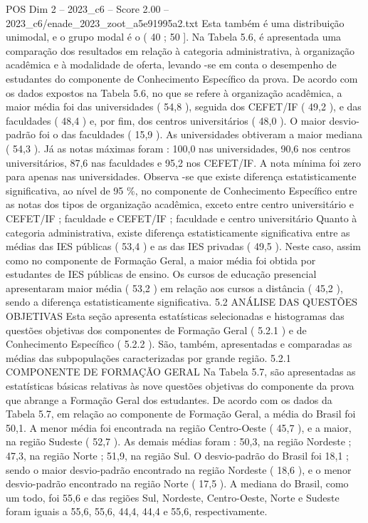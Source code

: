 \begin{textsample}{POS Dim 2 – 2023\_c6 – Score 2.00 – 2023\_c6/enade\_2023\_zoot\_a5e91995a2.txt}
Esta também é uma distribuição unimodal, e o grupo modal é o ( 40 ; 50 ].
Na Tabela 5.6, é apresentada uma comparação dos resultados em relação à categoria administrativa, à organização acadêmica e à modalidade de oferta, levando -se em conta o desempenho de estudantes do componente de Conhecimento Específico da prova.
De acordo com os dados expostos na Tabela 5.6, no que se refere à organização acadêmica, a maior média foi das universidades ( 54,8 ), seguida dos CEFET/IF ( 49,2 ), e das faculdades ( 48,4 ) e, por fim, dos centros universitários ( 48,0 ).
O maior desvio-padrão foi o das faculdades ( 15,9 ).
As universidades obtiveram a maior mediana ( 54,3 ).
Já as notas máximas foram : 100,0 nas universidades, 90,6 nos centros universitários, 87,6 nas faculdades e 95,2 nos CEFET/IF.
A nota mínima foi zero para apenas nas universidades.
Observa -se que existe diferença estatisticamente significativa, ao nível de 95 \%, no componente de Conhecimento Específico entre as notas dos tipos de organização acadêmica, exceto entre centro universitário e CEFET/IF ; faculdade e CEFET/IF ; faculdade e centro universitário Quanto à categoria administrativa, existe diferença estatisticamente significativa entre as médias das IES públicas ( 53,4 ) e as das IES privadas ( 49,5 ).
Neste caso, assim como no componente de Formação Geral, a maior média foi obtida por estudantes de IES públicas de ensino.
Os cursos de educação presencial apresentaram maior média ( 53,2 ) em relação aos cursos a distância ( 45,2 ), sendo a diferença estatisticamente significativa. 5.2 ANÁLISE DAS QUESTÕES OBJETIVAS Esta seção apresenta estatísticas selecionadas e histogramas das questões objetivas dos componentes de Formação Geral ( 5.2.1 ) e de Conhecimento Específico ( 5.2.2 ).
São, também, apresentadas e comparadas as médias das subpopulações caracterizadas por grande região. 5.2.1 COMPONENTE DE FORMAÇÃO GERAL Na Tabela 5.7, são apresentadas as estatísticas básicas relativas às nove questões objetivas do componente da prova que abrange a Formação Geral dos estudantes.
De acordo com os dados da Tabela 5.7, em relação ao componente de Formação Geral, a média do Brasil foi 50,1.
A menor média foi encontrada na região Centro-Oeste ( 45,7 ), e a maior, na região Sudeste ( 52,7 ).
As demais médias foram : 50,3, na região Nordeste ; 47,3, na região Norte ; 51,9, na região Sul.
O desvio-padrão do Brasil foi 18,1 ; sendo o maior desvio-padrão encontrado na região Nordeste ( 18,6 ), e o menor desvio-padrão encontrado na região Norte ( 17,5 ).
A mediana do Brasil, como um todo, foi 55,6 e das regiões Sul, Nordeste, Centro-Oeste, Norte e Sudeste foram iguais a 55,6, 55,6, 44,4, 44,4 e 55,6, respectivamente.

\end{textsample}
